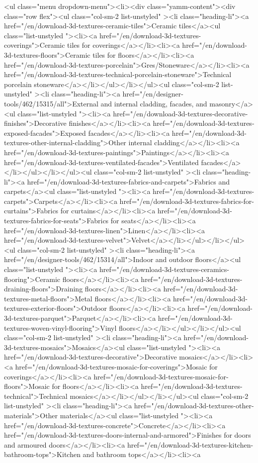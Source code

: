                          
            <ul class="menu dropdown-menu"><li><div class="yamm-content"><div class="row flex"><ul class="col-sm-2 list-unstyled" ><li class="heading-li"><a href="/en/download-3d-textures-ceramic-tiles">Ceramic tiles</a><ul class="list-unstyled "><li><a href="/en/download-3d-textures-coverings">Ceramic tiles for coverings</a></li><li><a href="/en/download-3d-textures-floors">Ceramic tiles for floors</a></li><li><a href="/en/download-3d-textures-porcelain">Gres/Stoneware</a></li><li><a href="/en/download-3d-textures-technical-porcelain-stoneware">Technical porcelain stoneware</a></li></ul></li></ul><ul class="col-sm-2 list-unstyled" ><li class="heading-li"><a href="/en/designer-tools/462/15315/all">External and internal cladding, facades, and masonry</a><ul class="list-unstyled "><li><a href="/en/download-3d-textures-decorative-finishes">Decorative finishes</a></li><li><a href="/en/download-3d-textures-exposed-facades">Exposed facades</a></li><li><a href="/en/download-3d-textures-other-internal-cladding">Other internal cladding</a></li><li><a href="/en/download-3d-textures-paintings">Paintings</a></li><li><a href="/en/download-3d-textures-ventilated-facades">Ventilated facades</a></li></ul></li></ul><ul class="col-sm-2 list-unstyled" ><li class="heading-li"><a href="/en/download-3d-textures-fabrics-and-carpets">Fabrics and carpets</a><ul class="list-unstyled "><li><a href="/en/download-3d-textures-carpets">Carpets</a></li><li><a href="/en/download-3d-textures-fabrics-for-curtains">Fabrics for curtains</a></li><li><a href="/en/download-3d-textures-fabrics-for-seats">Fabrics for seats</a></li><li><a href="/en/download-3d-textures-linen">Linen</a></li><li><a href="/en/download-3d-textures-velvet">Velvet</a></li></ul></li></ul><ul class="col-sm-2 list-unstyled" ><li class="heading-li"><a href="/en/designer-tools/462/15314/all">Indoor and outdoor floors</a><ul class="list-unstyled "><li><a href="/en/download-3d-textures-ceramics-flooring">Ceramic floors</a></li><li><a href="/en/download-3d-textures-draining-floors">Draining floors</a></li><li><a href="/en/download-3d-textures-metal-floors">Metal floors</a></li><li><a href="/en/download-3d-textures-exterior-floors">Outdoor floors</a></li><li><a href="/en/download-3d-textures-parquet">Parquet</a></li><li><a href="/en/download-3d-textures-woven-vinyl-flooring">Vinyl floors</a></li></ul></li></ul><ul class="col-sm-2 list-unstyled" ><li class="heading-li"><a href="/en/download-3d-textures-mosaics">Mosaics</a><ul class="list-unstyled "><li><a href="/en/download-3d-textures-decorative">Decorative mosaics</a></li><li><a href="/en/download-3d-textures-mosaic-for-coverings">Mosaic for coverings</a></li><li><a href="/en/download-3d-textures-mosaic-for-floors">Mosaic for floors</a></li><li><a href="/en/download-3d-textures-technical">Technical mosaics</a></li></ul></li></ul><ul class="col-sm-2 list-unstyled" ><li class="heading-li"><a href="/en/download-3d-textures-other-materials">Other materials</a><ul class="list-unstyled "><li><a href="/en/download-3d-textures-concrete">Concrete</a></li><li><a href="/en/download-3d-textures-doors-internal-and-armored">Finishes for doors and armoured doors</a></li><li><a href="/en/download-3d-textures-kitchen-bathroom-tops">Kitchen and bathroom tops</a></li><li><a 